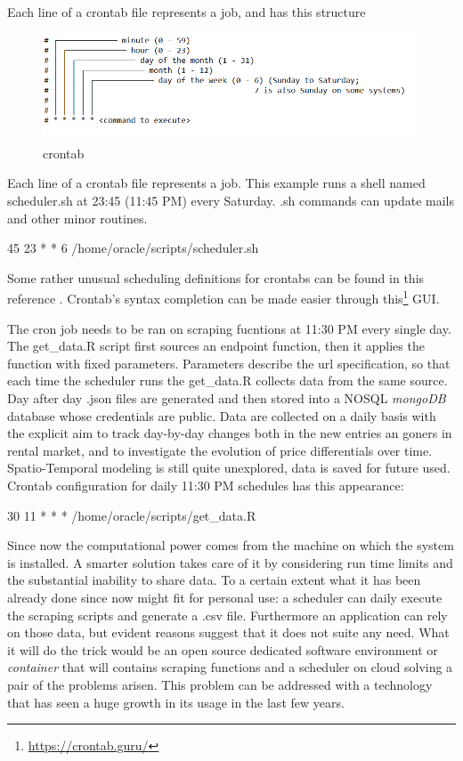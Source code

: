\documentclass[
  12pt,
  a4paper,
  oneside]{book}
\DeclareRobustCommand{\href}[2]{#2\footnote{\url{#1}}}
\begin{document}
Each line of a crontab file represents a job, and has this structure

\begin{figure}
\centering
\includegraphics{images/crontab.PNG}
\caption{crontab}
\end{figure}

Each line of a crontab file represents a job. This example runs a shell named scheduler.sh at 23:45 (11:45 PM) every Saturday. .sh commands can update mails and other minor routines.

45 23 * * 6 /home/oracle/scripts/scheduler.sh

Some rather unusual scheduling definitions for crontabs can be found in this reference \citep{wiki:cronjob}. Crontab's syntax completion can be made easier through \href{https://crontab.guru/}{this} GUI.

The cron job needs to be ran on scraping fucntions at 11:30 PM every single day. The get\_data.R script first sources an endpoint function, then it applies the function with fixed parameters. Parameters describe the url specification, so that each time the scheduler runs the get\_data.R collects data from the same source. Day after day .json files are generated and then stored into a NOSQL \emph{mongoDB} database whose credentials are public. Data are collected on a daily basis with the explicit aim to track day-by-day changes both in the new entries an goners in rental market, and to investigate the evolution of price differentials over time. Spatio-Temporal modeling is still quite unexplored, data is saved for future used. Crontab configuration for daily 11:30 PM schedules has this appearance:

30 11 * * * /home/oracle/scripts/get\_data.R

Since now the computational power comes from the machine on which the system is installed. A smarter solution takes care of it by considering run time limits and the substantial inability to share data. To a certain extent what it has been already done since now might fit for personal use: a scheduler can daily execute the scraping scripts and generate a .csv file. Furthermore an application can rely on those data, but evident reasons suggest that it does not suite any need. What it will do the trick would be an open source dedicated software environment or \emph{container} that will contains scraping functions and a scheduler on cloud solving a pair of the problems arisen. This problem can be addressed with a technology that has seen a huge growth in its usage in the last few years.
\end{document}
